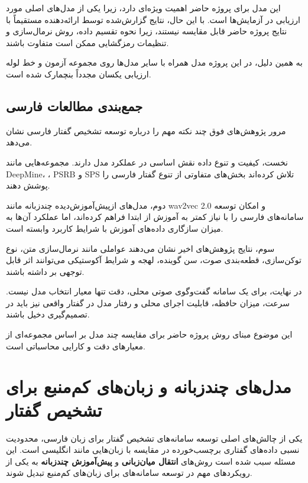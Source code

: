 این مدل برای پروژه حاضر اهمیت ویژه‌ای دارد، زیرا یکی از
مدل‌های اصلی مورد ارزیابی در آزمایش‌ها است.
با این حال، نتایج گزارش‌شده توسط ارائه‌دهنده مستقیماً با
نتایج پروژه حاضر قابل مقایسه نیستند، زیرا نحوه تقسیم داده،
روش نرمال‌سازی و تنظیمات رمزگشایی ممکن است متفاوت باشند.

به همین دلیل، در این پروژه مدل  همراه با سایر
مدل‌ها روی مجموعه آزمون و خط لوله ارزیابی یکسان مجدداً
بنچمارک شده است.


\subsection{جمع‌بندی مطالعات  فارسی}

مرور پژوهش‌های فوق چند نکته مهم را درباره توسعه تشخیص گفتار
فارسی نشان می‌دهد.

نخست، کیفیت و تنوع داده نقش اساسی در عملکرد مدل دارند.
مجموعه‌هایی مانند DeepMine، ، PSRB و SPS تلاش
کرده‌اند بخش‌های متفاوتی از تنوع گفتار فارسی را پوشش دهند.

دوم، مدل‌های ازپیش‌آموزش‌دیده چندزبانه مانند wav2vec 2.0
و  امکان توسعه سامانه‌های فارسی را با نیاز کمتر به
آموزش از ابتدا فراهم کرده‌اند، اما عملکرد آن‌ها به میزان
سازگاری داده‌های آموزش با شرایط کاربرد وابسته است.

سوم، نتایج پژوهش‌های اخیر نشان می‌دهند عواملی مانند
نرمال‌سازی متن، نوع توکن‌سازی، قطعه‌بندی صوت، سن گوینده،
لهجه و شرایط آکوستیکی می‌توانند اثر قابل توجهی بر  داشته
باشند.

در نهایت، برای یک سامانه گفت‌وگوی صوتی محلی، دقت تنها معیار
انتخاب مدل نیست.
سرعت، میزان حافظه، قابلیت اجرای محلی و رفتار مدل در گفتار
واقعی نیز باید در تصمیم‌گیری دخیل باشند.

این موضوع مبنای روش پروژه حاضر برای مقایسه چند مدل 
بر اساس مجموعه‌ای از معیارهای دقت و کارایی محاسباتی است.

\section{مدل‌های چندزبانه و زبان‌های کم‌منبع برای تشخیص گفتار}

یکی از چالش‌های اصلی توسعه سامانه‌های تشخیص گفتار برای زبان فارسی،
محدودیت نسبی داده‌های گفتاری برچسب‌خورده در مقایسه با زبان‌هایی
مانند انگلیسی است.
این مسئله سبب شده است روش‌های
\textbf{انتقال میان‌زبانی}
و
\textbf{پیش‌آموزش چندزبانه}
به یکی از رویکردهای مهم در توسعه سامانه‌های  برای زبان‌های
کم‌منبع تبدیل شوند.

